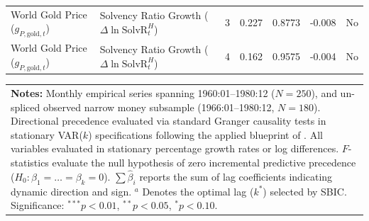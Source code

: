 \begin{table}[p]
{\begin{tabular}{llccccc}
World Gold Price ($g_{P,\text{gold},t}$) & Solvency Ratio Growth ($\Delta \ln \text{SolvR}_t^H$) & 3 & 0.227 & 0.8773 & -0.008 & No \\
World Gold Price ($g_{P,\text{gold},t}$) & Solvency Ratio Growth ($\Delta \ln \text{SolvR}_t^H$) & 4 & 0.162 & 0.9575 & -0.004 & No \\
\bottomrule
\end{tabular}%
}
\begin{tabular}{p{}}
\fontsize{6pt}{6.8pt}\selectfont \textbf{Notes:} Monthly empirical series spanning 1960:01--1980:12 ($N=250$), and un-spliced observed narrow money subsample (1966:01--1980:12, $N=180$). Directional precedence evaluated via standard Granger causality tests in stationary VAR($k$) specifications following the applied blueprint of \citet{Bachurewicz2019}. All variables evaluated in stationary percentage growth rates or log differences. $F$-statistics evaluate the null hypothesis of zero incremental predictive precedence ($H_0: \beta_1 = \dots = \beta_k = 0$). $\sum \hat{\beta}_i$ reports the sum of lag coefficients indicating dynamic direction and sign. $^a$ Denotes the optimal lag ($k^*$) selected by SBIC. Significance: $^{***} p < 0.01$, $^{**} p < 0.05$, $^{*} p < 0.10$.
\end{tabular}
\end{table}
